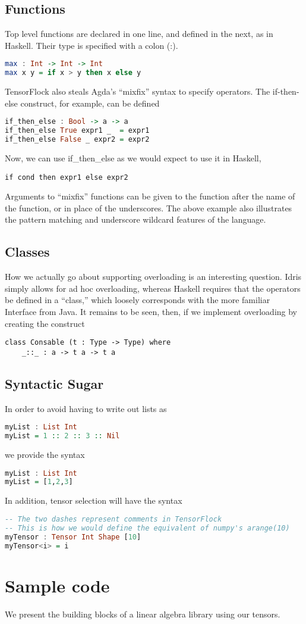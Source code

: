 \documentclass[12pt]{article}
\begin{document}
\subsection{Functions}
Top level functions are declared in one line, and defined in the next, as in Haskell. Their type is specified with a colon (:).
\begin{lstlisting}[language=Haskell]
max : Int -> Int -> Int
max x y = if x > y then x else y
\end{lstlisting}
TensorFlock also steals Agda's ``mixfix'' syntax to specify operators. The if-then-else construct, for example, can be defined
\begin{lstlisting}[language=Haskell]
if_then_else : Bool -> a -> a
if_then_else True expr1 _  = expr1
if_then_else False _ expr2 = expr2
\end{lstlisting}
Now, we can use if\_then\_else as we would expect to use it in Haskell, 
\begin{lstlisting}
if cond then expr1 else expr2
\end{lstlisting}
Arguments to ``mixfix'' functions can be given to the function after the name of the function, or in place of the underscores. The above example also illustrates the pattern matching and underscore wildcard features of the language. 
\subsection{Classes}
How we actually go about supporting overloading is an interesting question. Idris simply allows for ad hoc overloading, whereas Haskell requires that the operators be defined in a ``class,'' which loosely corresponds with the more familiar Interface from Java. It remains to be seen, then, if we implement overloading by creating the construct 
\begin{lstlisting}
class Consable (t : Type -> Type) where
	_::_ : a -> t a -> t a
\end{lstlisting}
\subsection{Syntactic Sugar}
In order to avoid having to write out lists as 
\begin{lstlisting}[language=Haskell]
myList : List Int
myList = 1 :: 2 :: 3 :: Nil
\end{lstlisting}
we provide the syntax 
\begin{lstlisting}[language=Haskell]
myList : List Int
myList = [1,2,3]
\end{lstlisting}
In addition, tensor selection will have the syntax
\begin{lstlisting}[language=Haskell]
-- The two dashes represent comments in TensorFlock
-- This is how we would define the equivalent of numpy's arange(10)
myTensor : Tensor Int Shape [10]
myTensor<i> = i 
\end{lstlisting}
\section{Sample code}
We present the building blocks of a linear algebra library using our tensors.
\end{document}
